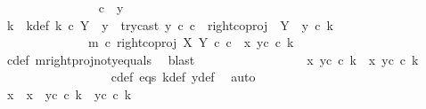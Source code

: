 \begin{isabellebody}
\isanewline
\ \ \ \ \ \ \ \ \ \ \ \ \ \ \isamarkupfalse%
\ {\isachardoublequoteopen}c\ {\isasymnoteq}\ y{}{\isachardoublequoteclose}\ \ \ \ \ \ \ \ \ \ \ \ \ \ \isanewline
\ \ \ \ \ \ \ \ \ \ \ \ \ \ \isamarkupfalse%
\ \isamarkupfalse%
\ k{\isacharprime}{\kern0pt}\ \ k{\isacharprime}{\kern0pt}{\isacharunderscore}{\kern0pt}def{\isacharcolon}{\kern0pt}\ {\isachardoublequoteopen}k{\isacharprime}{\kern0pt}\ {\isasymin}\isactrlsub c\ Y\ {\isasymsetminus}\ {\isacharparenleft}{\kern0pt}{\isasymone}{\isacharcomma}{\kern0pt}y{}{\isacharparenright}{\kern0pt}\ {\isasymand}\ try{\isacharunderscore}{\kern0pt}cast\ y{}\ {\isasymcirc}\isactrlsub c\ c\ {\isacharequal}{\kern0pt}\ right{\isacharunderscore}{\kern0pt}coproj\ {\isasymone}\ {\isacharparenleft}{\kern0pt}Y\ {\isasymsetminus}\ {\isacharparenleft}{\kern0pt}{\isasymone}{\isacharcomma}{\kern0pt}y{}{\isacharparenright}{\kern0pt}{\isacharparenright}{\kern0pt}\ {\isasymcirc}\isactrlsub c\ k{\isacharprime}{\kern0pt}\ {\isasymand}\ \isanewline
\ \ \ \ \ \ \ \ \ \ \ \ \ \ m\ {\isasymcirc}\isactrlsub c\ right{\isacharunderscore}{\kern0pt}coproj\ X\ Y\ {\isasymcirc}\isactrlsub c\ c\ {\isacharequal}{\kern0pt}\ {\isasymlangle}x{}{\isacharcomma}{\kern0pt}\ y{}\isactrlsup c\ {\isasymcirc}\isactrlsub c\ k{\isacharprime}{\kern0pt}{\isasymrangle}{\isachardoublequoteclose}\isanewline
\ \ \ \ \ \ \ \ \ \ \ \ \ \ \ \ \isamarkupfalse%
\ c{\isacharunderscore}{\kern0pt}def\ m{\isacharunderscore}{\kern0pt}rightproj{\isacharunderscore}{\kern0pt}not{\isacharunderscore}{\kern0pt}y{}{\isacharunderscore}{\kern0pt}equals\ \isamarkupfalse%
\ blast\isanewline
\ \ \ \ \ \ \ \ \ \ \ \ \ \ \isamarkupfalse%
\ \isamarkupfalse%
\ {\isachardoublequoteopen}{\isasymlangle}x{}{\isacharcomma}{\kern0pt}\ y{}\isactrlsup c\ {\isasymcirc}\isactrlsub c\ k{\isacharprime}{\kern0pt}{\isasymrangle}\ {\isacharequal}{\kern0pt}\ {\isasymlangle}x{}{\isacharcomma}{\kern0pt}\ y{}\isactrlsup c\ {\isasymcirc}\isactrlsub c\ k{\isasymrangle}{\isachardoublequoteclose}\isanewline
\ \ \ \ \ \ \ \ \ \ \ \ \ \ \ \ \isamarkupfalse%
\ c{\isacharunderscore}{\kern0pt}def\ eqs\ k{\isacharunderscore}{\kern0pt}def\ y{\isacharunderscore}{\kern0pt}def\ \isamarkupfalse%
\ auto\isanewline
\ \ \ \ \ \ \ \ \ \ \ \ \ \ \isamarkupfalse%
\ \isamarkupfalse%
\ {\isachardoublequoteopen}{\isacharparenleft}{\kern0pt}x{}\ {\isacharequal}{\kern0pt}\ x{}{\isacharparenright}{\kern0pt}\ {\isasymand}\ {\isacharparenleft}{\kern0pt}y{}\isactrlsup c\ {\isasymcirc}\isactrlsub c\ k{\isacharprime}{\kern0pt}\ {\isacharequal}{\kern0pt}\ y{}\isactrlsup c\ {\isasymcirc}\isactrlsub c\ k{\isacharparenright}{\kern0pt}{\isachardoublequoteclose}\isanewline

\end{isabellebody}
